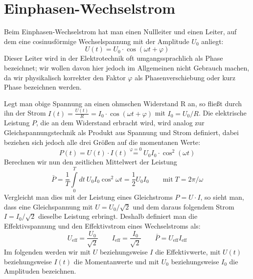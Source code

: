 
\section{Einphasen-Wechselstrom}\label{wechsel}
Beim Einphasen-Wechselstrom hat man einen Nullleiter und einen Leiter, auf dem eine cosinusförmige Wechselspannung mit der Amplitude $U_0$ anliegt:
\begin{equation}
U(t)=U_0 \cdot \cos(\omega t + \varphi)
\end{equation}
Dieser Leiter wird in der Elektrotechnik oft umgangssprachlich als Phase bezeichnet; wir wollen davon hier jedoch im Allgemeinen nicht Gebrauch machen, da wir physikalisch korrekter den Faktor $\varphi$ als Phasenverschiebung oder kurz Phase bezeichnen werden.

Legt man obige Spannung an einen ohmschen Widerstand R an, so fließt durch ihn der Strom $I(t)= \frac{U(t)}{R} = I_0 \cdot \cos(\omega t + \varphi)$ mit $I_0 = U_0/R$.
Die elektrische Leistung $P$, die an dem Widerstand erbracht wird, wird analog zur Gleichspannungstechnik als Produkt aus Spannung und Strom definiert, dabei beziehen sich jedoch alle drei Größen auf die momentanen Werte:
\begin{equation}
P(t) = U(t) \cdot I(t) \stackrel{\mathrm{\varphi=0}}= U_0 I_0 \cdot \cos^2(\omega t)
\end{equation}
Berechnen wir nun den zeitlichen Mittelwert der Leistung
\begin{equation}\label{eq:Wirkleistung_ohne_phi}
\bar{P}=\frac1T \int\limits_0^T dt\: U_0 I_0 \cos^2 \omega t = \frac12 U_0 I_0 \qquad\mathrm{mit}\; T=2\pi/\omega
\end{equation}
Vergleicht man dies mit der Leistung eines Gleichstroms $P=U\cdot I$, so sieht man, dass eine Gleichspannung mit $U=U_0 / \sqrt2$ und dem daraus folgendem Strom $I=I_0 / \sqrt2$ dieselbe Leistung erbringt.
Deshalb definiert man die Effektivspannung und den Effektivstrom eines Wechselstroms als:
\begin{equation*}
U_{\mathrm{eff}} = \frac{U_0}{\sqrt2} \qquad I_{\mathrm{eff}} = \frac{I_0}{\sqrt2} \qquad \bar{P}=U_{\mathrm{eff}}I_{\mathrm{eff}}
\end{equation*}
Im folgenden werden wir mit $U$ beziehungsweise $I$ die Effektivwerte, mit $U(t)$ beziehungsweise $I(t)$ die Momentanwerte und mit $U_0$ beziehungsweise $I_0$ die Amplituden bezeichnen.





